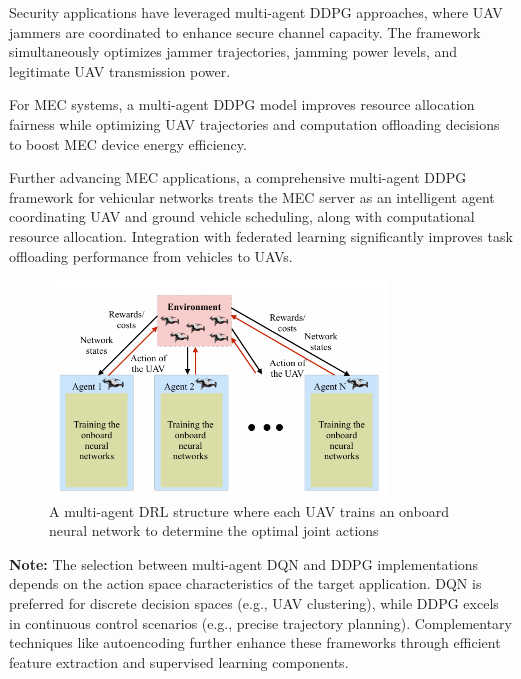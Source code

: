 Security applications have leveraged multi-agent DDPG approaches, where UAV jammers are coordinated to enhance secure channel capacity. The framework simultaneously optimizes jammer trajectories, jamming power levels, and legitimate UAV transmission power.

For MEC systems, a multi-agent DDPG model improves resource allocation fairness while optimizing UAV trajectories and computation offloading decisions to boost MEC device energy efficiency.

Further advancing MEC applications, a comprehensive multi-agent DDPG framework for vehicular networks treats the MEC server as an intelligent agent coordinating UAV and ground vehicle scheduling, along with computational resource allocation. Integration with federated learning significantly improves task offloading performance from vehicles to UAVs.

\begin{figure}[h!]
\centering
\includegraphics[width=0.8\textwidth]{Figures/Chapter2/Section1/5.png}
\caption{A multi-agent DRL structure where each UAV trains an onboard neural network to determine the optimal joint actions~\cite{kurunathan2022machine}}
\label{multi_agent_drl_structure}
\end{figure}

\textbf{Note:} The selection between multi-agent DQN and DDPG implementations depends on the action space characteristics of the target application. DQN is preferred for discrete decision spaces (e.g., UAV clustering), while DDPG excels in continuous control scenarios (e.g., precise trajectory planning). Complementary techniques like autoencoding further enhance these frameworks through efficient feature extraction and supervised learning components.








